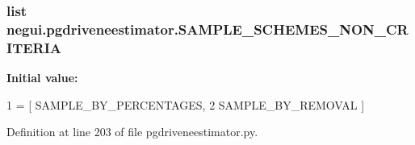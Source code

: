 \subsubsection[{\texorpdfstring{S\+A\+M\+P\+L\+E\+\_\+\+S\+C\+H\+E\+M\+E\+S\+\_\+\+N\+O\+N\+\_\+\+C\+R\+I\+T\+E\+R\+IA}{SAMPLE_SCHEMES_NON_CRITERIA}}]{\setlength{\rightskip}{0pt plus 5cm}list negui.\+pgdriveneestimator.\+S\+A\+M\+P\+L\+E\+\_\+\+S\+C\+H\+E\+M\+E\+S\+\_\+\+N\+O\+N\+\_\+\+C\+R\+I\+T\+E\+R\+IA}\hypertarget{namespacenegui_1_1pgdriveneestimator_a2d9d6cbe867f7222f090e8fa43d5c04d}{}\label{namespacenegui_1_1pgdriveneestimator_a2d9d6cbe867f7222f090e8fa43d5c04d}
{\bfseries Initial value\+:}
\begin{DoxyCode}
1 = [ SAMPLE\_BY\_PERCENTAGES, 
2                                     SAMPLE\_BY\_REMOVAL ]
\end{DoxyCode}


Definition at line 203 of file pgdriveneestimator.\+py.

